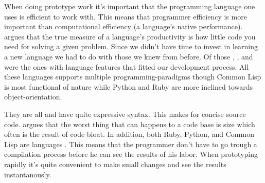 When doing prototype work it's important that the programming language one
uses is efficient to work with. This means that programmer efficiency is more
important than computational efficiency (a language's native performance).
\citet{mcanally08} argues that the true measure of a language's productivity
is how little code you need for solving a given problem.
Since we didn't have time to invest in learning a new language we had to do
with those we knew from before. Of those %
,
%
, and
%
were the ones with language features that fitted our development process.
All these languages supports multiple programming-paradigms though Common
Lisp is most functional of nature  while Python and Ruby are more
inclined towards object-orientation.

They are all %
and have quite expressive syntax. This makes for concise source code.
\citet{yegge07} argues that the worst thing that can happens to a code base is
size which often is the result of code bloat. In addition, both Ruby, Python,
and Common Lisp are  languages%
.
This means that the programmer don't have to go trough a compilation process
before he can see the results of his labor. When prototyping rapidly it's
quite convenient to make small changes and see the results instantanously.

